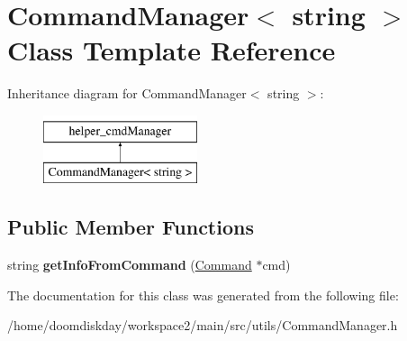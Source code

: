 \hypertarget{classCommandManager_3_01string_01_4}{}\section{Command\+Manager$<$ string $>$ Class Template Reference}
\label{classCommandManager_3_01string_01_4}
Inheritance diagram for Command\+Manager$<$ string $>$\+:\begin{figure}[H]
\begin{center}
\leavevmode
\includegraphics[height=2.000000cm]{classCommandManager_3_01string_01_4}
\end{center}
\end{figure}
\subsection*{Public Member Functions}
\begin{DoxyCompactItemize}
\item 
string {\bfseries get\+Info\+From\+Command} (\hyperlink{classCommand}{Command} $\ast$cmd)\hypertarget{classCommandManager_3_01string_01_4_a78542c11499eae788e790e44a3f5e5c6}{}\label{classCommandManager_3_01string_01_4_a78542c11499eae788e790e44a3f5e5c6}

\end{DoxyCompactItemize}


The documentation for this class was generated from the following file\+:\begin{DoxyCompactItemize}
\item 
/home/doomdiskday/workspace2/main/src/utils/Command\+Manager.\+h\end{DoxyCompactItemize}
